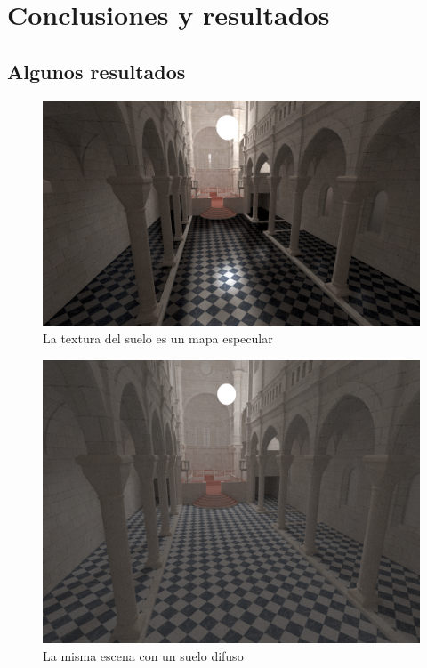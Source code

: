 \chapter{Conclusiones y resultados}

\section{Algunos resultados}

\begin{figure}[h]
\centering
\includegraphics[width=5in]{sibenik_specular.png}
\caption{La textura del suelo es un mapa especular}
\end{figure}

\begin{figure}
\centering
\includegraphics[width=5in]{sibenik_difuse.png}
\caption{La misma escena con un suelo difuso}
\end{figure}

